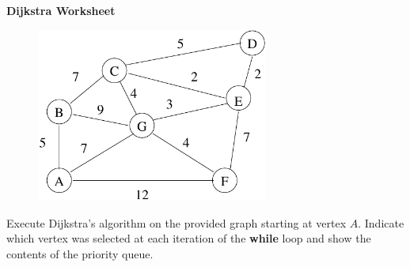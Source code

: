 \documentclass[12pt]{article}
\begin{document}
\newcommand{\I}{\mbox{{\em Int}}}
\newcommand{\lt}{\mbox{{\em left}}}
\newcommand{\rt}{\mbox{{\em right}}}
\newcommand{\ld}{\Delta^l}
\newcommand{\rd}{\Delta^r}
\newcommand{\lsp}[1]{\large\renewcommand{\baselinestretch}{#1}\normalsize}
\newcommand{\hsp}{\hspace{.2in}}

\def\Endwhile{\mbox{\bf endwhile\ }}
\def\Or{\mbox{\bf or\ }}
\def\Do{\mbox{\bf do\ }}
\def\Downto{\mbox{\bf downto\ }}
\def\Int{\mbox{\bf int\ }}
\def\To{\mbox{\bf to\ }}
\def\Repeat{\mbox{\bf repeat\ }}
\def\Until{\mbox{\bf until\ }}
\def\Return{\mbox{\bf return\ }}
\def\Not{\mbox{\bf not\ }}
\def\And{\mbox{\bf and\ }}
\def\For{\mbox{\bf for\ }}
\def\Foreach{\mbox{\bf foreach\ }}
\def\Else{\mbox{\bf else\ }}
\def\Elseif{\mbox{\bf elseif\ }}
\def\End{\mbox{\bf end\ }}
\def\If{\mbox{\bf if\ }}
\def\Mod{\mbox{\bf \ mod\ }}
\def\Then{\mbox{\bf then\ }}
\def\While{\mbox{\bf while\ }}
\def\Output{\mbox{\bf output\ }}


\lsp{1}
\pagestyle{plain}
\begin{center}
{\bf
Dijkstra Worksheet
}
\end{center}

\begin{figure}[h]
\center
\includegraphics[width = 3in]{spanning.pdf}
\end{figure}

Execute Dijkstra's algorithm on the provided graph starting
at vertex $A$. Indicate which vertex was selected at each 
iteration of the {\bf while} loop and show the contents of
the priority queue.
\end{document}
